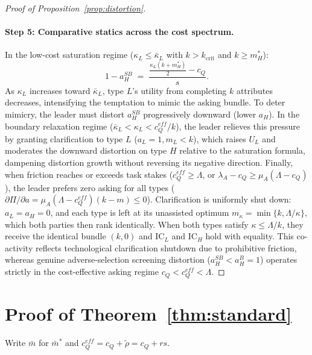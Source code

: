 \documentclass[11pt]{article}
\begin{document}
\begin{proof}[Proof of Proposition~\ref{prop:distortion}]
\paragraph{Step 5: Comparative statics across the cost spectrum.}
In the low-cost saturation regime ($\kappa_L \le \bar\kappa_L$ with $k > k_{\text{crit}}$ and $k \ge m_H^*$):
\[
1 - a_H^{SB} \;=\; \frac{\frac{\kappa_L(k + m_H^*)}{2} - c_Q}{s}.
\]
As $\kappa_L$ increases toward $\bar\kappa_L$, type $L$'s utility from completing $k$ attributes decreases, intensifying the temptation to mimic the asking bundle. To deter mimicry, the leader must distort $a_H^{SB}$ progressively downward (lower $a_H$).
In the boundary relaxation regime ($\bar\kappa_L < \kappa_L < c_Q^{eff}/k$), the leader relieves this pressure by granting clarification to type $L$ ($a_L = 1, m_L < k$), which raises $U_L$ and moderates the downward distortion on type $H$ relative to the saturation formula, dampening distortion growth without reversing its negative direction.
Finally, when friction reaches or exceeds task stakes ($c_Q^{eff} \ge \Lambda$, or $\lambda_A - c_Q \ge \mu_A(\Lambda - c_Q)$), the leader prefers zero asking for all types ($\partial\Pi/\partial a = \mu_A(\Lambda - c_Q^{eff})(k-m) \le 0$). Clarification is uniformly shut down: $a_L = a_H = 0$, and each type is left at its unassisted optimum $m_\kappa = \min\{k, \Lambda/\kappa\}$, which both parties then rank identically. When both types satisfy $\kappa \le \Lambda/k$, they receive the identical bundle $(k, 0)$ and $\text{IC}_L$ and $\text{IC}_H$ hold with equality. This co-activity reflects technological clarification shutdown due to prohibitive friction, whereas genuine adverse-selection screening distortion ($a_H^{SB} < a_H^B = 1$) operates strictly in the cost-effective asking regime $c_Q < c_Q^{eff} < \Lambda$.
\end{proof}

\section{Proof of Theorem~\ref{thm:standard}}
\label{app:standard}

Write $\bar m$ for $\bar m^*$ and $c_Q^{eff} = c_Q + \tilde\rho = c_Q + rs$.
\end{document}
